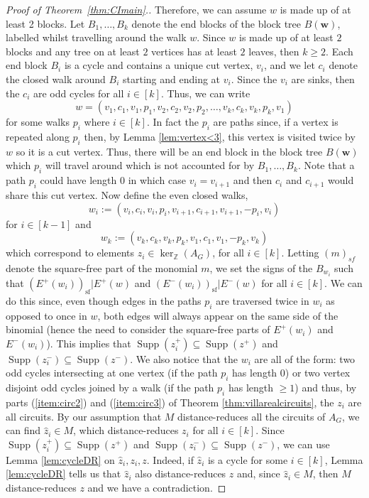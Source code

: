\documentclass[a4paper, 12pt]{article}
\newcommand{\ZZ}{\mathbb Z}
\theoremstyle{plain}
\theoremstyle{definition}
\theoremstyle{remark}
\begin{document}
\begin{proof}[Proof of Theorem~\ref{thm:CImain}.]
       Therefore, we can assume $w$ is made up of at least 2 blocks. Let $B_1,\dots,B_k$ denote the end blocks of the block tree $B(\mathbf{w})$, labelled whilst travelling around the walk $w$. Since $w$ is made up of at least $2$ blocks and any tree on at least $2$ vertices has at least $2$ leaves, then $k \ge 2$. Each end block $B_i$ is a cycle and contains a unique cut vertex, $v_i$, and we let $c_i$ denote the closed walk around $B_i$ starting and ending at $v_i$. Since the $v_i$ are sinks, then the $c_i$ are odd cycles for all $i \in [k]$. Thus, we can write 
    $$w=(v_1,c_1,v_1,p_1,v_2,c_2,v_2,p_2,\dots,v_k,c_k,v_k,p_k,v_1)$$ 
    for some walks $p_i$ where $i \in [k]$. In fact the $p_i$ are paths since, if a vertex is repeated along $p_i$ then, by Lemma \ref{lem:vertex<3}, this vertex is visited twice by $w$ so it is a cut vertex. Thus, there will be an end block in the block tree $B(\mathbf{w})$ which $p_i$ will travel around which is not accounted for by $B_1,\dots, B_k$. Note that a path $p_i$ could have length $0$ in which case $v_i=v_{i+1}$ and then $c_i$ and $c_{i+1}$ would share this cut vertex. Now define the even closed walks, 
    $$w_i:=(v_i,c_i,v_i,p_i,v_{i+1},c_{i+1},v_{i+1},-p_i,v_i)$$ 
    for $i \in [k-1]$ and 
    $$w_{k}:=(v_k,c_k,v_k,p_k,v_{1},c_{1},v_{1},-p_k,v_k)$$ 
    which correspond to elements $z_i \in \ker_\ZZ(A_G)$, for all $i \in [k]$. Letting $(m)_{sf}$ denote the square-free part of the monomial $m$, we set the signs of the $B_{w_i}$ such that $(E^+(w_i))_{\mathrm{sf}}|E^+(w)$ and $(E^-(w_i))_{\mathrm{sf}}|E^-(w)$ for all $i \in [k]$. We can do this since, even though edges in the paths $p_i$ are traversed twice in $w_i$ as opposed to once in $w$, both edges will always appear on the same side of the binomial (hence the need to consider the square-free parts of $E^+(w_i)$ and $E^-(w_i)$). This implies that $\operatorname{Supp}(z_i^+) \subseteq \operatorname{Supp}(z^+)$ and $\operatorname{Supp}(z_i^-) \subseteq \operatorname{Supp}(z^-)$. We also notice that the $w_i$ are all of the form: two odd cycles intersecting at one vertex (if the path $p_i$ has length $0$) or two vertex disjoint odd cycles joined by a walk (if the path $p_i$ has length $\ge 1$) and thus, by parts (\ref{item:circ2}) and (\ref{item:circ3}) of Theorem \ref{thm:villarealcircuits}, the $z_i$ are all circuits. By our assumption that $M$ distance-reduces all the circuits of $A_G$, we can find $\hat z_i \in M$, which distance-reduces $z_i$ for all $i \in [k]$. Since $\operatorname{Supp}(z_i^+) \subseteq \operatorname{Supp}(z^+)$ and $\operatorname{Supp}(z_i^-) \subseteq \operatorname{Supp}(z^-)$, we can use Lemma \ref{lem:cycleDR} on $\hat z_i,z_i,z$. Indeed, if $\hat z_i$ is a cycle for some $i \in [k]$, Lemma \ref{lem:cycleDR} tells us that $\hat z_i$ also distance-reduces $z$ and, since $\hat z_i \in M$, then $M$ distance-reduces $z$ and we have a contradiction. 
    

\end{proof}
\end{document}
